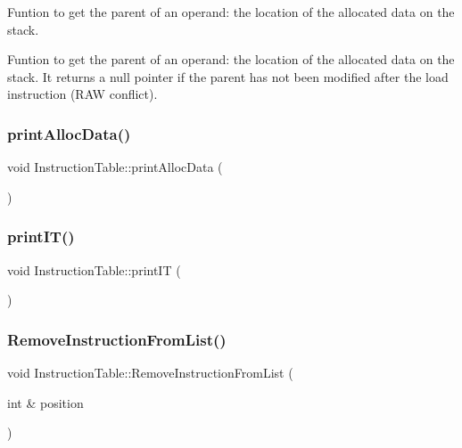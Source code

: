 Funtion to get the parent of an operand\+: the location of the allocated data on the stack.

Funtion to get the parent of an operand\+: the location of the allocated data on the stack. It returns a null pointer if the parent has not been modified after the load instruction (R\+AW conflict). \mbox{\label{classoctantis_1_1InstructionTable_a0ed0b3774f3551c6a1161394a33ea8d3}} 
\subsubsection{\texorpdfstring{print\+Alloc\+Data()}{printAllocData()}}
{\footnotesize\ttfamily void Instruction\+Table\+::print\+Alloc\+Data (\begin{DoxyParamCaption}{ }\end{DoxyParamCaption})}

\mbox{\label{classoctantis_1_1InstructionTable_a949d0ad63e3f990f845fdb632b4c97fa}} 
\subsubsection{\texorpdfstring{print\+I\+T()}{printIT()}}
{\footnotesize\ttfamily void Instruction\+Table\+::print\+IT (\begin{DoxyParamCaption}{ }\end{DoxyParamCaption})}

\mbox{\label{classoctantis_1_1InstructionTable_a30b7f55d07699df52d48822ea4f886b4}} 
\subsubsection{\texorpdfstring{Remove\+Instruction\+From\+List()}{RemoveInstructionFromList()}}
{\footnotesize\ttfamily void Instruction\+Table\+::\+Remove\+Instruction\+From\+List (\begin{DoxyParamCaption}\item[{int \&}]{position }\end{DoxyParamCaption})}



